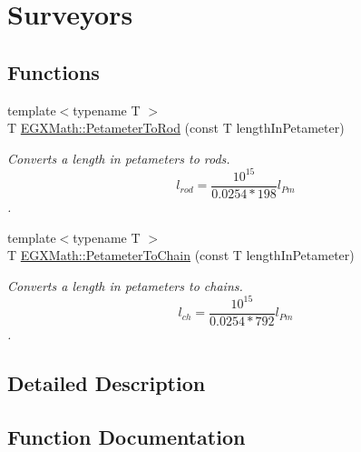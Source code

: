 \hypertarget{group___e_g_x_math-_conversions-_length_conversions-_petameter-_surveyors}{}\section{Surveyors}
\label{group___e_g_x_math-_conversions-_length_conversions-_petameter-_surveyors}
\subsection*{Functions}
\begin{DoxyCompactItemize}
\item 
{\footnotesize template$<$typename T $>$ }\\T \mbox{\hyperlink{group___e_g_x_math-_conversions-_length_conversions-_petameter-_surveyors_gae7cef029bdb3e7ace9aa08e0183cc202}{E\+G\+X\+Math\+::\+Petameter\+To\+Rod}} (const T length\+In\+Petameter)
\begin{DoxyCompactList}\small\item\em Converts a length in petameters to rods. \[ l_{rod}= \frac{10^{15}}{0.0254 * 198} l_{Pm} \]. \end{DoxyCompactList}\item 
{\footnotesize template$<$typename T $>$ }\\T \mbox{\hyperlink{group___e_g_x_math-_conversions-_length_conversions-_petameter-_surveyors_ga2d17d0bd003489d3d72d4ed1a2bd2f97}{E\+G\+X\+Math\+::\+Petameter\+To\+Chain}} (const T length\+In\+Petameter)
\begin{DoxyCompactList}\small\item\em Converts a length in petameters to chains. \[ l_{ch}= \frac{10^{15}}{0.0254 * 792} l_{Pm} \]. \end{DoxyCompactList}\end{DoxyCompactItemize}


\subsection{Detailed Description}


\subsection{Function Documentation}
\mbox{\label{group___e_g_x_math-_conversions-_length_conversions-_petameter-_surveyors_ga2d17d0bd003489d3d72d4ed1a2bd2f97}} 
